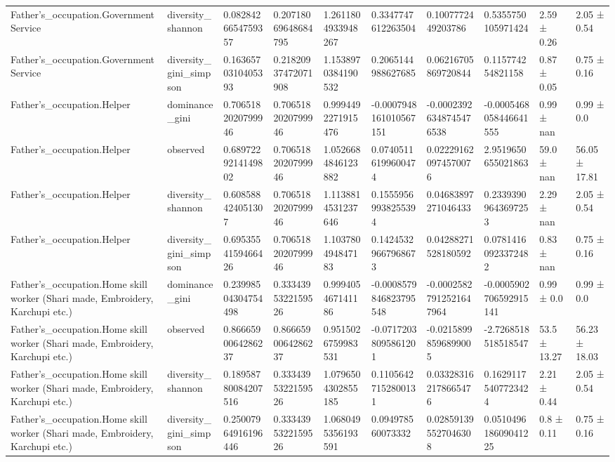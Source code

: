 \begin{longtable}{llllllllll}
Father’s\_occupation.Government Service & diversity\_shannon & 0.0828426654759357 & 0.20718069648684795 & 1.2611804933948267 & 0.3347747612263504 & 0.1007772449203786 & 0.5355750105971424 & 2.59 ± 0.26 & 2.05 ± 0.54 \\
Father’s\_occupation.Government Service & diversity\_gini\_simpson & 0.1636570310405393 & 0.21820937472071908 & 1.1538970384190532 & 0.2065144988627685 & 0.06216705869720844 & 0.115774254821158 & 0.87 ± 0.05 & 0.75 ± 0.16 \\
Father’s\_occupation.Helper & dominance\_gini & 0.7065182020799946 & 0.7065182020799946 & 0.9994492271915476 & -0.0007948161010567151 & -0.00023926348745476538 & -0.0005468058446641555 & 0.99 ± nan & 0.99 ± 0.0 \\
Father’s\_occupation.Helper & observed & 0.6897229214149802 & 0.7065182020799946 & 1.0526684846123882 & 0.07405116199600474 & 0.022291620974570076 & 2.9519650655021863 & 59.0 ± nan & 56.05 ± 17.81 \\
Father’s\_occupation.Helper & diversity\_shannon & 0.608588424051307 & 0.7065182020799946 & 1.1138814531237646 & 0.15559569938255394 & 0.04683897271046433 & 0.23393909643697253 & 2.29 ± nan & 2.05 ± 0.54 \\
Father’s\_occupation.Helper & diversity\_gini\_simpson & 0.6953554159466426 & 0.7065182020799946 & 1.103780494847183 & 0.14245329667968673 & 0.04288271528180592 & 0.07814160923372482 & 0.83 ± nan & 0.75 ± 0.16 \\
Father’s\_occupation.Home skill worker (Shari made, Embroidery, Karchupi etc.) & dominance\_gini & 0.23998504304754498 & 0.3334395322159526 & 0.999405467141186 & -0.0008579846823795548 & -0.00025827912521647964 & -0.0005902706592915141 & 0.99 ± 0.0 & 0.99 ± 0.0 \\
Father’s\_occupation.Home skill worker (Shari made, Embroidery, Karchupi etc.) & observed & 0.8666590064286237 & 0.8666590064286237 & 0.9515026759983531 & -0.07172038095861201 & -0.02158998596899005 & -2.7268518518518547 & 53.5 ± 13.27 & 56.23 ± 18.03 \\
Father’s\_occupation.Home skill worker (Shari made, Embroidery, Karchupi etc.) & diversity\_shannon & 0.18958780084207516 & 0.3334395322159526 & 1.0796504302855185 & 0.11056427152800131 & 0.033283162178665476 & 0.16291175407723424 & 2.21 ± 0.44 & 2.05 ± 0.54 \\
Father’s\_occupation.Home skill worker (Shari made, Embroidery, Karchupi etc.) & diversity\_gini\_simpson & 0.25007964916196446 & 0.3334395322159526 & 1.0680495356193591 & 0.094978560073332 & 0.028591395527046308 & 0.051049618609041225 & 0.8 ± 0.11 & 0.75 ± 0.16 \\

\end{longtable}
